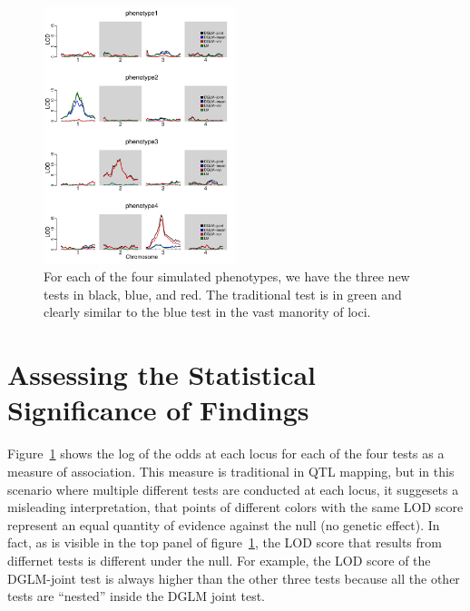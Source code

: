 \documentclass[9pt,twocolumn,twoside]{gsag3jnl}
\begin{document}
\begin{figure}
	\includegraphics[width=0.5\textwidth]{images/LOD_scans.pdf}
	\caption{For each of the four simulated phenotypes, we have the three new tests in black, blue, and red.  The traditional test is in green and clearly similar to the blue test in the vast manority of loci. \label{fig:lod_score_scans}}
\end{figure}

\section{Assessing the Statistical Significance of Findings}

Figure~\ref{fig:lod_score_scans} shows the log of the odds at each locus for each of the four tests as a measure of association.
This measure is traditional in QTL mapping, but in this scenario where multiple different tests are conducted at each locus, it suggesets a misleading interpretation, that points of different colors with the same LOD score represent an equal quantity of evidence against the null (no genetic effect).
In fact, as is visible in the top panel of figure~\ref{fig:lod_score_scans}, the LOD score that results from differnet tests is different under the null.
For example, the LOD score of the DGLM-joint test is always higher than the other three tests because all the other tests are ``nested'' inside the DGLM joint test.


\end{document}
